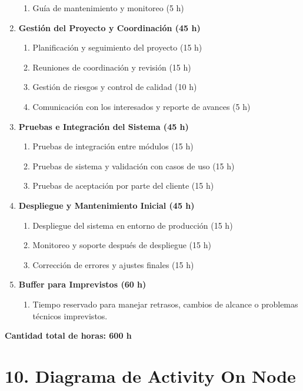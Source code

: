 \documentclass[
11pt, %
]{charter}
\begin{document}
\begin{enumerate}
\begin{enumerate}
\item Guía de mantenimiento y monitoreo (5 h)
\end{enumerate}
\item \textbf{Gestión del Proyecto y Coordinación (45 h)}
\begin{enumerate}
\item Planificación y seguimiento del proyecto (15 h)
\item Reuniones de coordinación y revisión (15 h)
\item Gestión de riesgos y control de calidad (10 h)
\item Comunicación con los interesados y reporte de avances (5 h)
\end{enumerate}
\item \textbf{Pruebas e Integración del Sistema (45 h)}
\begin{enumerate}
\item Pruebas de integración entre módulos (15 h)
\item Pruebas de sistema y validación con casos de uso (15 h)
\item Pruebas de aceptación por parte del cliente (15 h)
\end{enumerate}
\item \textbf{Despliegue y Mantenimiento Inicial (45 h)}
\begin{enumerate}
\item Despliegue del sistema en entorno de producción (15 h)
\item Monitoreo y soporte después de despliegue (15 h)
\item Corrección de errores y ajustes finales (15 h)
\end{enumerate}
\item \textbf{Buffer para Imprevistos (60 h)}
\begin{enumerate}
\item Tiempo reservado para manejar retrasos, cambios de alcance o problemas técnicos imprevistos.
\end{enumerate}
\end{enumerate}

\textbf{Cantidad total de horas: 600 h}


\section{10. Diagrama de Activity On Node}
\label{sec:AoN}
\end{document}
